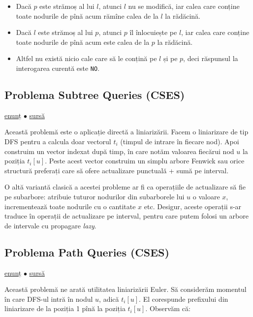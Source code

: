 \documentclass[../main.tex]{subfiles}
\begin{document}
\begin{itemize}
  \item Dacă $p$ este strămoș al lui $l$, atunci $l$ nu se modifică, iar calea care conține toate nodurile de pînă acum rămîne calea de la $l$ la rădăcină.
  \item Dacă $l$ este strămoș al lui $p$, atunci $p$ îl înlocuiește pe $l$, iar calea care conține toate nodurile de pînă acum este calea de la $p$ la rădăcină.
  \item Altfel nu există nicio cale care să le conțină pe $l$ și pe $p$, deci răspunsul la interogarea curentă este \texttt{NO}.
\end{itemize}

\subsection{Problema Subtree Queries (CSES)}
\label{problem:subtree-queries}

\href{https://cses.fi/problemset/task/1137}{enunț}
$\bullet$
\hyperref[code:subtree-queries]{sursă}

Această problemă este o aplicație directă a liniarizării. Facem o liniarizare de tip DFS pentru a calcula doar vectorul $t_i$ (timpul de intrare în fiecare nod). Apoi construim un vector indexat după timp, în care notăm valoarea fiecărui nod $u$ la poziția $t_i[u]$. Peste acest vector construim un simplu arbore Fenwick sau orice structură preferați care să ofere actualizare punctuală + sumă pe interval.

O altă variantă clasică a acestei probleme ar fi ca operațiile de actualizare să fie pe subarbore: atribuie tuturor nodurilor din subarborele lui $u$ o valoare $x$, incrementează toate nodurile cu o cantitate $x$ etc. Desigur, aceste operații s-ar traduce în operații de actualizare pe interval, pentru care putem folosi un arbore de intervale cu propagare \textit{lazy}.

\subsection{Problema Path Queries (CSES)}
\label{problem:path-queries}

\href{https://cses.fi/problemset/task/1138}{enunț}
$\bullet$
\hyperref[code:path-queries]{sursă}

Această problemă ne arată utilitatea liniarizării Euler. Să considerăm momentul în care DFS-ul intră în nodul $u$, adică $t_i[u]$. El corespunde prefixului din liniarizare de la poziția 1 pînă la poziția $t_i[u]$. Observăm că:
\end{document}
